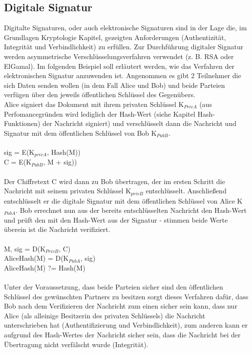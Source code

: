\documentclass[10pt, a4paper]{scrreprt}
\begin{document}
\subsection{Digitale Signatur}
Digitalte Signaturen, oder auch elektronische Signaturen sind in der Lage die, im Grundlagen Kryptologie Kapitel, gezeigten Anforderungen (Authentizität, Integrität und Verbindlichkeit) zu erfüllen. Zur Durchführung digitaler Signatur werden asymmetrische Verschlüsselungsverfahren verwendet (z. B. RSA oder ElGamal). Im folgenden Beispiel soll erläutert werden, wie das Verfahren der elektronischen Signatur anzuwenden ist. Angenommen es gibt 2 Teilnehmer die sich Daten senden wollen (in dem Fall Alice und Bob) und beide Parteien verfügen über den jeweils öffentlichen Schlüssel des Gegenübers. \\
Alice signiert das Dokument mit ihrem privaten Schlüssel K$_{PrivA}$ (aus Perfomancegründen wird lediglich der Hash-Wert (siehe Kapitel Hash-Funktionen) der Nachricht signiert) und verschlüsselt dann die Nachricht und Signatur mit dem öffentlichen Schlüssel von Bob K$_{PubB}$. \\ \\
sig =  E(K$_{privA}$, Hash(M)) \\
C = E(K$_{PubB}$, M + sig)) \\ \\
Der Chiffretext C wird dann zu Bob übertragen, der im ersten Schritt die Nachricht mit seinem privaten Schlüssel K$_{privB}$ entschlüsselt. Anschließend entschlüsselt er die digitale Signatur mit dem öffentlichen Schlüssel von Alice K$_{PubA}$. Bob errechnet nun aus der bereits entschlüsselten Nachricht den Hash-Wert und prüft den mit den Hash-Wert aus der Signatur - stimmen beide Werte überein ist die Nachricht verifiziert. \\ \\
M, sig = D(K$_{PrivB}$, C) \\
AliceHash(M) = D(K$_{PubA}$, sig) \\
AliceHash(M) ?= Hash(M) \\ \\
Unter der Voraussetzung, dass beide Parteien sicher sind den öffentlichen Schlüssel des gewünschten Partners zu besitzen sorgt dieses Verfahren dafür, dass Bob nach dem Verifizieren der Nachricht zum einen sicher sein kann, dass nur Alice (als alleinige Besitzerin des privaten Schlüssels) die Nachricht unterschrieben hat (Authentifizierung und Verbindlichkeit), zum anderen kann er aufgrund des Hash-Wertes der Nachricht sicher sein, dass die Nachricht bei der Übertragung nicht verfälscht wurde (Integrität).
\end{document}
